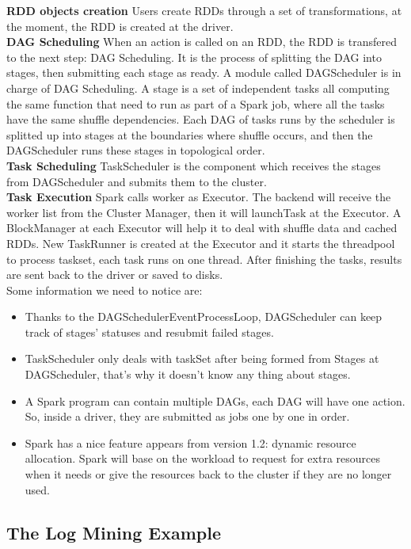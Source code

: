 \textbf{RDD objects creation} Users create RDDs through a set of transformations, at the moment, the RDD is created at the driver.\\
\textbf{DAG Scheduling} When an action is called on an RDD, the RDD is transfered to the next step: DAG Scheduling. It is the process of splitting the DAG into stages, then submitting each stage as ready.
A module called DAGScheduler is in charge of DAG Scheduling. A stage is a set of independent tasks all computing the same function that need to run as part of a Spark job, where all the tasks have the same shuffle dependencies. Each DAG of tasks runs by the scheduler is splitted up into stages at the boundaries where shuffle occurs, and then the DAGScheduler runs these stages in topological order.\\
\textbf{Task Scheduling} TaskScheduler is the component which receives the stages from DAGScheduler and submits them to the cluster.\\
\textbf{Task Execution} Spark calls worker as Executor. The backend will receive the worker list from the Cluster Manager, then it will launchTask at the Executor. A BlockManager at each Executor will help it to deal with shuffle data and cached RDDs. New TaskRunner is created at the Executor and it starts the threadpool to process taskset, each task runs on one thread. After finishing the tasks, results are sent back to the driver or saved to disks.\\

Some information we need to notice are:
\begin{itemize}
\item Thanks to the DAGSchedulerEventProcessLoop, DAGScheduler can keep track of stages’ statuses and resubmit failed stages.
\item TaskScheduler only deals with taskSet after being formed from Stages at DAGScheduler,  that’s why it doesn’t know any thing about stages.
\item A Spark program can contain multiple DAGs, each DAG will have one action. So, inside a driver, they are submitted as jobs one by one in order.
\item Spark has a nice feature appears from version 1.2: dynamic resource allocation. Spark will base on the workload to request for extra resources when it needs or give the resources back to the cluster if they are no longer used.
\end{itemize}

\subsection{The Log Mining Example}

